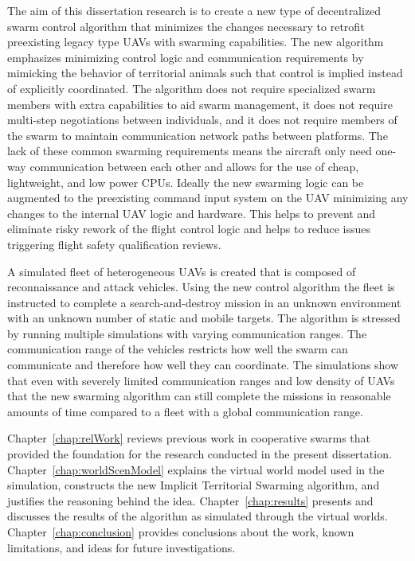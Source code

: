 The aim of this dissertation research is to create a new type of decentralized swarm control algorithm that minimizes the changes necessary to retrofit preexisting legacy type UAVs with swarming capabilities.  The new algorithm emphasizes minimizing control logic and communication requirements by mimicking the behavior of territorial animals such that control is implied instead of explicitly coordinated.  The algorithm does not require specialized swarm members with extra capabilities to aid swarm management, it does not require multi-step negotiations between individuals, and it does not require members of the swarm to maintain communication network paths between platforms.  The lack of these common swarming requirements means the aircraft only need one-way communication between each other and allows for the use of cheap, lightweight, and low power CPUs.  Ideally the new swarming logic can be augmented to the preexisting command input system on the UAV minimizing any changes to the internal UAV logic and hardware.  This helps to prevent and eliminate risky rework of the flight control logic and helps to reduce issues triggering flight safety qualification reviews.

A simulated fleet of heterogeneous UAVs is created that is composed of reconnaissance and attack vehicles.  Using the new control algorithm the fleet is instructed to complete a search-and-destroy mission in an unknown environment with an unknown number of static and mobile targets.  The algorithm is stressed by running multiple simulations with varying communication ranges.  The communication range of the vehicles restricts how well the swarm can communicate and therefore how well they can coordinate.  The simulations show that even with severely limited communication ranges and low density of UAVs that the new swarming algorithm can still complete the missions in reasonable amounts of time compared to a fleet with a global communication range.

Chapter~\ref{chap:relWork} reviews previous work in cooperative swarms that provided the foundation for the research conducted in the present dissertation.  Chapter~\ref{chap:worldScenModel} explains the virtual world model used in the simulation, constructs the new Implicit Territorial Swarming algorithm, and justifies the reasoning behind the idea.  Chapter~\ref{chap:results} presents and discusses the results of the algorithm as simulated through the virtual worlds.  Chapter~\ref{chap:conclusion} provides conclusions about the work, known limitations, and ideas for future investigations.

